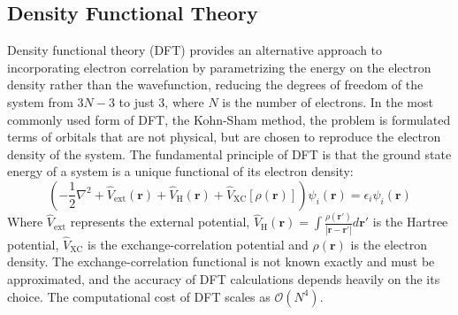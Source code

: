 \iffalse\subsection{Møller-Plesset Perturbation Theory}
Møller-Plesset (MP)\cite{shavitt2009many} perturbation theory offers a way to improve upon the HF energy by the use of Rayleigh-Schrodinger perturbation theory: the electron correlation is treated as a perturbation to the HF Hamiltonian. The energy and wavefunction are then expanded as a series in terms of the perturbation strength. The first-order energy correction in MP theory is zero, so the first non-trivial correction to the HF energy appears at the second order, giving rise to the MP2 method. The MP2 energy correction for a closed-shell molecule is given by:
\begin{equation} \label{eq:MP2}
    E_{\mathrm{MP2}} = - \frac{1}{4} \sum_{ij}^{\mathrm{occ}} \sum_{ab}^{\mathrm{virt}} \frac{|\langle i j || a b \rangle|^2}{\epsilon_a + \epsilon_b - \epsilon_i - \epsilon_j}
\end{equation}
Where $i,j$ denote occupied molecular orbitals, $a,b$ denote virtual molecular orbitals, and $\epsilon$ are the corresponding orbital energies from the HF calculation. MP theory can be extended to higher orders (MP3, MP4, etc.) to achieve greater accuracy, although the computational cost increases significantly with each order. The computational cost of MP2 scales as $\mathcal{O}(N^5)$. \fi

\subsection{Density Functional Theory}
Density functional theory (DFT)\cite{hohenberg1964density,kohn1965self} provides an alternative approach to incorporating electron correlation by parametrizing the energy on the electron density rather than the wavefunction, reducing the degrees of freedom of the system from $3N-3$ to just $3$, where $N$ is the number of electrons. In the most commonly used form of DFT, the Kohn-Sham method, the problem is formulated terms of orbitals that are not physical, but are chosen to reproduce the electron density of the system. The fundamental principle of DFT is that the ground state energy of a system is a unique functional of its electron density:
\begin{equation}\label{eq:KSDFT}
    \left( -\frac{1}{2} \nabla^2 + \hat{V}_{\mathrm{ext}}(\mathbf{r}) + \hat{V}_\mathrm{H}(\mathbf{r}) + \hat{V}_{\mathrm{XC}}[\rho(\mathbf{r})] \right) \psi_i(\mathbf{r}) = \epsilon_i \psi_i(\mathbf{r})
\end{equation}
Where $\hat{V}_{\mathrm{ext}}$ represents the external potential, $\hat{V}_\mathrm{H}(\mathbf{r}) = \int \frac{\rho(\mathbf{r}')}{|\mathbf{r} - \mathbf{r}'|} d\mathbf{r}'$ is the Hartree potential, $\hat{V}_{\mathrm{XC}}$ is the exchange-correlation potential and $\rho(\mathbf{r})$ is the electron density. The exchange-correlation functional is not known exactly and must be approximated, and the accuracy of DFT calculations depends heavily on the its choice. The computational cost of DFT scales as $\mathcal{O}(N^4)$.

